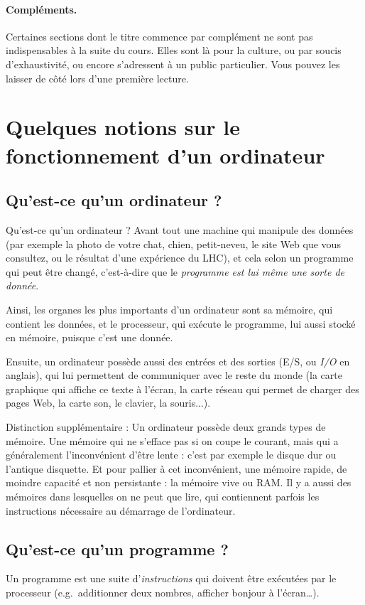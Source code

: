 \paragraph{Compléments.}
Certaines sections dont le titre commence par \og complément \fg{}
ne sont pas indispensables à la suite du cours.
Elles sont là pour la culture, ou par soucis d'exhaustivité,
ou encore s'adressent à un public particulier.
Vous pouvez les laisser de côté lors d'une première lecture.

\section{Quelques notions sur le fonctionnement d'un ordinateur}
\subsection{Qu'est-ce qu'un ordinateur ?}
Qu'est-ce qu'un ordinateur ?
Avant tout une machine qui manipule des données
(par exemple la photo de votre chat, chien, petit-neveu,
le site Web que vous consultez, ou le résultat d'une expérience du LHC),
et cela selon un programme qui peut être changé,
c'est-à-dire que le \emph{programme est lui même une sorte de donnée}.

Ainsi, les organes les plus importants d'un ordinateur sont
sa mémoire, qui contient les données, et le processeur,
qui exécute le programme, lui aussi stocké en mémoire, puisque c'est une donnée.

Ensuite, un ordinateur possède aussi des entrées et des sorties (E/S, ou \emph{I/O} en anglais),
qui lui permettent de communiquer avec le reste du monde
(la carte graphique qui affiche ce texte à l'écran,
la carte réseau qui permet de charger des pages Web,
la carte son, le clavier, la souris...).

Distinction supplémentaire : Un ordinateur possède deux grands types de mémoire.
Une mémoire qui ne s'efface pas si on coupe le courant,
mais qui a généralement l'inconvénient d'être lente :
c'est par exemple le disque dur ou l'antique disquette.
Et pour pallier à cet inconvénient, une mémoire rapide,
de moindre capacité et non persistante : la mémoire vive ou RAM.
Il y a aussi des mémoires dans lesquelles on ne peut que lire, qui
contiennent parfois les instructions nécessaire au démarrage de l'ordinateur.
\subsection{Qu'est-ce qu'un programme ?}
Un programme est une suite d'\emph{instructions} qui doivent être exécutées par le processeur
(e.g.\ additionner deux nombres, afficher \og bonjour \fg{} à l'écran…).

